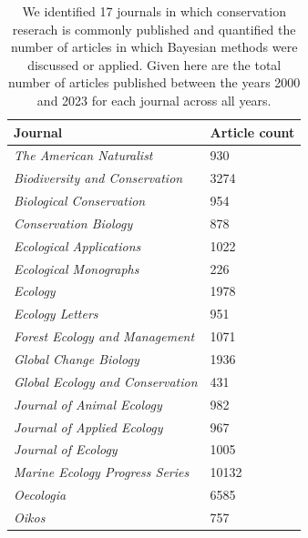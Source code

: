 \documentclass{article}
\begin{document}
\begin{table}[h]
  \centering
  \caption{We identified 17 journals in which conservation reserach is commonly published and quantified the number of articles in which Bayesian methods were discussed or applied. Given here are the total number of articles published between the years 2000 and 2023 for each journal across all years.}
    \begin{tabular}{|l|l|}
    \hline
      \cellcolor{Gray}Journal & \cellcolor{Gray}Article count\\
      \hline
      \textit{The American Naturalist} & 930\\
      \textit{Biodiversity and Conservation} & 3274\\
      \textit{Biological Conservation} & 954\\
      \textit{Conservation Biology} & 878\\
      \textit{Ecological Applications} & 1022\\
      \textit{Ecological Monographs} & 226\\
      \textit{Ecology} & 1978\\
      \textit{Ecology Letters} & 951\\
      \textit{Forest Ecology and Management} & 1071\\
      \textit{Global Change Biology} & 1936\\
      \textit{Global Ecology and Conservation} & 431\\
      \textit{Journal of Animal Ecology} & 982\\
      \textit{Journal of Applied Ecology} & 967\\
      \textit{Journal of Ecology} & 1005\\
      \textit{Marine Ecology Progress Series} & 10132\\
      \textit{Oecologia} & 6585\\
      \textit{Oikos} & 757\\
    \hline
  \end{tabular}
\label{tab:article-counts}
\end{table}

\end{document}
